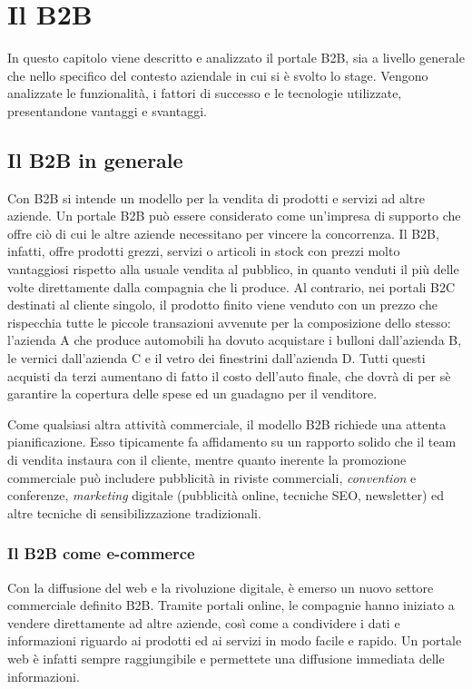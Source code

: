\chapter{Il B2B}
\begin{flushright}
	\parbox{13cm}{\small In questo capitolo viene descritto e analizzato il portale B2B, sia a livello generale che nello specifico del contesto aziendale in cui si è svolto lo stage. Vengono analizzate le funzionalità, i fattori di successo e le tecnologie utilizzate, presentandone vantaggi e svantaggi.}
\end{flushright}
\section{Il B2B in generale}
Con B2B si intende un modello per la vendita di prodotti e servizi ad altre aziende. Un portale B2B può essere considerato come un'impresa di supporto che offre ciò di cui le altre aziende necessitano per vincere la concorrenza. Il B2B, infatti, offre prodotti grezzi, servizi o articoli in stock con prezzi molto vantaggiosi rispetto alla usuale vendita al pubblico, in quanto venduti il più delle volte direttamente dalla compagnia che li produce. Al contrario, nei portali B2C destinati al cliente singolo, il prodotto finito viene venduto con un prezzo che rispecchia tutte le piccole transazioni avvenute per la composizione dello stesso: l'azienda A che produce automobili ha dovuto acquistare i bulloni dall'azienda B, le vernici dall'azienda C e il vetro dei finestrini dall'azienda D. Tutti questi acquisti da terzi aumentano di fatto il costo dell'auto finale, che dovrà di per sè garantire la copertura delle spese ed un guadagno per il venditore.

Come qualsiasi altra attività commerciale, il modello B2B richiede una attenta pianificazione. Esso tipicamente fa affidamento su un rapporto solido che il team di vendita instaura con il cliente, mentre quanto inerente la promozione commerciale può includere pubblicità in riviste commerciali, \textit{convention} e conferenze, \textit{marketing} digitale (pubblicità online, tecniche SEO, newsletter) ed altre tecniche di sensibilizzazione tradizionali.

\subsection{Il B2B come e-commerce}
Con la diffusione del web e la rivoluzione digitale, è emerso un nuovo settore commerciale definito B2B. Tramite portali online, le compagnie hanno iniziato a vendere direttamente ad altre aziende, così come a condividere i dati e informazioni riguardo ai prodotti ed ai servizi in modo facile e rapido. Un portale web è infatti sempre raggiungibile e permettete una diffusione immediata delle informazioni.


